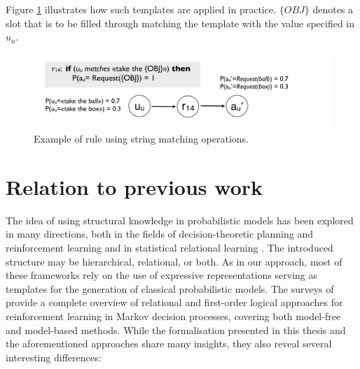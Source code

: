 Figure \ref{fig:stringmanip} illustrates how such templates are applied in practice.  $\{OBJ\}$ denotes a slot that is to be filled through matching the template with the value specified in $u_u$. 
\begin{figure}[h]
\centering
\includegraphics[scale=0.25]{imgs/stringmanip.pdf}
\caption{Example of rule using string matching operations.}
\label{fig:stringmanip}
\end{figure}

\section{Relation to previous work}
\label{sec:relatedwork}

The idea of using structural knowledge in probabilistic models has been explored in many directions, both in the fields of decision-theoretic planning and reinforcement learning \citep{Hauskrecht98,Pineau:2004,KerstingR04,lang10jair,Otterlo2012} and in statistical relational learning \citep{Jaeger01,Richardson:2006,getoor:srlbook07}.  The introduced structure may be hierarchical, relational, or both. As in our approach, most of these frameworks rely on the use of expressive representations serving as templates for the generation of classical probabilistic models.  The surveys of \cite{Otterlo2006,Otterlo2012} provide a complete overview of relational and first-order logical approaches for reinforcement learning in Markov decision processes, covering both model-free and model-based methods.  While the formalisation presented in this thesis and the aforementioned approaches share many insights, they also reveal several interesting differences: 

